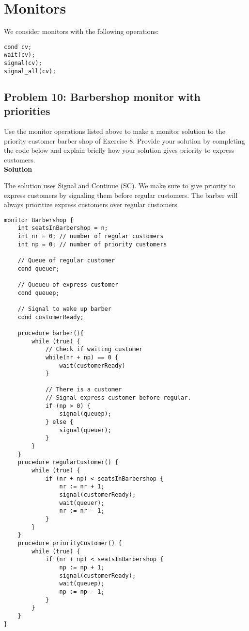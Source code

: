 \section{Monitors}

We consider monitors with the following operations:

\begin{lstlisting}
cond cv;
wait(cv);
signal(cv);
signal_all(cv);
\end{lstlisting}

\subsection{Problem 10: Barbershop monitor with priorities}

Use the monitor operations listed above
to make a monitor solution to the priority customer barber shop of Exercise 8. Provide your
solution by completing the code below and explain briefly how your solution gives priority to
express customers. \\


\textbf{Solution}

The solution uses Signal and Continue (SC). We make sure to give priority to express customers by signaling them before regular customers.
The barber will always prioritize express customers over regular customers. 

\begin{lstlisting}
monitor Barbershop {
    int seatsInBarbershop = n;
    int nr = 0; // number of regular customers
    int np = 0; // number of priority customers

    // Queue of regular customer
    cond queuer; 

    // Queueu of express customer
    cond queuep; 

    // Signal to wake up barber 
    cond customerReady;
    
    procedure barber(){
        while (true) {
            // Check if waiting customer 
            while(nr + np) == 0 { 
                wait(customerReady)
            }

            // There is a customer
            // Signal express customer before regular.
            if (np > 0) {
                signal(queuep); 
            } else {
                signal(queuer); 
            }
        }
    }
    procedure regularCustomer() {
        while (true) {
            if (nr + np) < seatsInBarbershop {
                nr := nr + 1;
                signal(customerReady);
                wait(queuer);
                nr := nr - 1;
            }
        }
    }
    procedure priorityCustomer() {
        while (true) {
            if (nr + np) < seatsInBarbershop {
                np := np + 1;
                signal(customerReady);
                wait(queuep);
                np := np - 1;
            }
        }
    }
}
\end{lstlisting}

